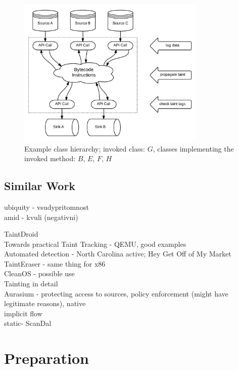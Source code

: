 \documentclass[12pt,twoside,notitlepage]{report}
\begin{document}
\begin{figure}
	\centerline{	
		\includegraphics[width=0.8\textwidth]{figs/fig_intro_tainting.png}
	}
	\caption{Example class hierarchy; invoked class: $G$, classes implementing the invoked method: $B$, $E$, $F$, $H$}
	\label{fig:Introduction_Overview}
\end{figure}

\section{Similar Work}

ubiquity - vsudypritomnost \\
amid - kvuli (negativni)

TaintDroid \cite{Enck:2010:TIT:1924943.1924971} \\
Towards practical Taint Tracking - QEMU, good examples \cite{Ermolinskiy:EECS-2010-92} \\
Automated detection - North Carolina active; Hey Get Off of My Market \cite{Yajin:12NDSS} \cite{Grace:2012:RSA:2307636.2307663} \\
TaintEraser - same thing for x86 \cite{Zhu:2011:TPS:1945023.1945039} \\
CleanOS - possible use \cite{Tang:2012:CLM:2387880.2387888} \\
Tainting in detail \cite{Schwartz:2010:YEW:1849417.1849981} \\
Aurasium - protecting access to sources, policy enforcement (might have legitimate reasons), native \cite{Xu:2012:APP:2362793.2362820} \\
implicit flow \cite{Nair:2008:VMB:1346355.1346524} \\
static- ScanDal \cite{2012kim_scandal}
\cleardoublepage
\chapter{Preparation}
\end{document}
